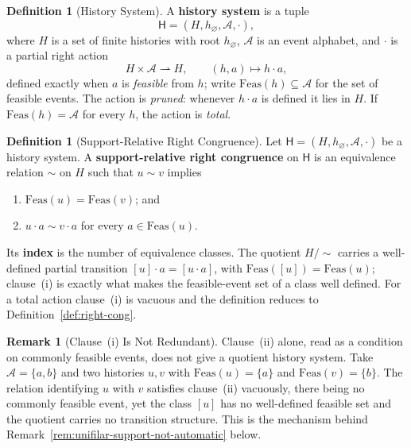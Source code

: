 \documentclass[12pt]{article}
\theoremstyle{definition}
\newtheorem{definition}[theorem]{Definition}
\newtheorem{remark}[theorem]{Remark}
\begin{document}
\begin{definition}[History System]
\label{def:history-system}
A \textbf{history system} is a tuple
\[
\mathsf H=(H,h_\varnothing,\mathcal A,\cdot),
\]
where $H$ is a set of finite histories with root $h_\varnothing$, $\mathcal A$
is an event alphabet, and $\cdot$ is a partial right action
\[
H\times\mathcal A\rightharpoonup H,
\qquad
(h,a)\mapsto h\cdot a,
\]
defined exactly when $a$ is \emph{feasible} from $h$; write
$\mathrm{Feas}(h)\subseteq\mathcal A$ for the set of feasible events.  The
action is \emph{pruned}: whenever $h\cdot a$ is defined it lies in $H$.  If
$\mathrm{Feas}(h)=\mathcal A$ for every $h$, the action is \emph{total}.
\end{definition}

\begin{definition}[Support-Relative Right Congruence]
\label{def:support-right-cong}
Let $\mathsf H=(H,h_\varnothing,\mathcal A,\cdot)$ be a history system.  A
\textbf{support-relative right congruence} on $\mathsf H$ is an equivalence
relation $\sim$ on $H$ such that $u\sim v$ implies
\begin{enumerate}[label=(\roman*),nosep]
\item $\mathrm{Feas}(u)=\mathrm{Feas}(v)$; and
\item $u\cdot a\sim v\cdot a$ for every $a\in\mathrm{Feas}(u)$.
\end{enumerate}
Its \textbf{index} is the number of equivalence classes.  The quotient
$H/\!\sim$ carries a well-defined partial transition $[u]\cdot a=[u\cdot a]$,
with $\mathrm{Feas}([u])=\mathrm{Feas}(u)$; clause~(i) is exactly what makes
the feasible-event set of a class well defined.  For a total action clause~(i)
is vacuous and the definition reduces to Definition~\ref{def:right-cong}.
\end{definition}

\begin{remark}[Clause~(i) Is Not Redundant]
\label{rem:support-clause-i-needed}
Clause~(ii) alone, read as a condition on commonly feasible events, does not
give a quotient history system.  Take $\mathcal A=\{a,b\}$ and two histories
$u,v$ with $\mathrm{Feas}(u)=\{a\}$ and $\mathrm{Feas}(v)=\{b\}$.  The
relation identifying $u$ with $v$ satisfies clause~(ii) vacuously, there being
no commonly feasible event, yet the class $[u]$ has no well-defined feasible
set and the quotient carries no transition structure.  This is the mechanism
behind Remark~\ref{rem:unifilar-support-not-automatic} below.
\end{remark}
\end{document}
